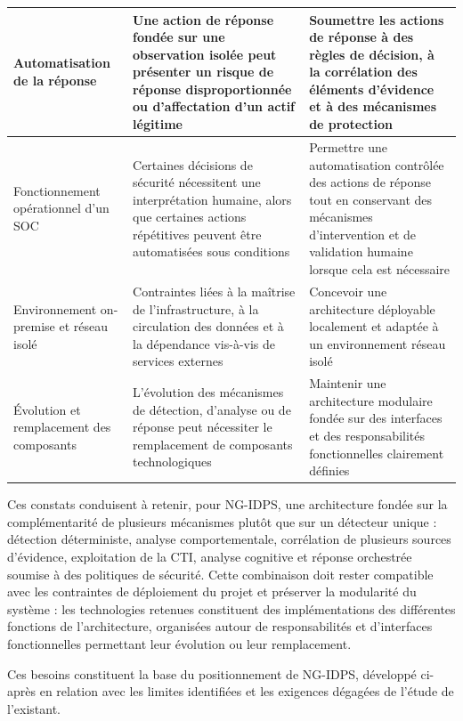 \begin{xltabular}{\textwidth}{|>{\raggedright\arraybackslash}X|>{\raggedright\arraybackslash}X|>{\raggedright\arraybackslash}X|}
Automatisation de la réponse &
Une action de réponse fondée sur une observation isolée peut présenter un risque de réponse disproportionnée ou d'affectation d'un actif légitime &
Soumettre les actions de réponse à des règles de décision, à la corrélation des éléments d'évidence et à des mécanismes de protection \\ \hline

Fonctionnement opérationnel d'un SOC &
Certaines décisions de sécurité nécessitent une interprétation humaine, alors que certaines actions répétitives peuvent être automatisées sous conditions &
Permettre une automatisation contrôlée des actions de réponse tout en conservant des mécanismes d'intervention et de validation humaine lorsque cela est nécessaire \\ \hline

Environnement on-premise et réseau isolé &
Contraintes liées à la maîtrise de l'infrastructure, à la circulation des données et à la dépendance vis-à-vis de services externes &
Concevoir une architecture déployable localement et adaptée à un environnement réseau isolé \\ \hline

Évolution et remplacement des composants &
L'évolution des mécanismes de détection, d'analyse ou de réponse peut nécessiter le remplacement de composants technologiques &
Maintenir une architecture modulaire fondée sur des interfaces et des responsabilités fonctionnelles clairement définies \\ \hline

\end{xltabular}


Ces constats conduisent à retenir, pour NG-IDPS, une architecture fondée sur la complémentarité de plusieurs mécanismes plutôt que sur un détecteur unique : détection déterministe, analyse comportementale, corrélation de plusieurs sources d'évidence, exploitation de la CTI, analyse cognitive et réponse orchestrée soumise à des politiques de sécurité. Cette combinaison doit rester compatible avec les contraintes de déploiement du projet et préserver la modularité du système : les technologies retenues constituent des implémentations des différentes fonctions de l'architecture, organisées autour de responsabilités et d'interfaces fonctionnelles permettant leur évolution ou leur remplacement.

Ces besoins constituent la base du positionnement de NG-IDPS, développé ci-après en relation avec les limites identifiées et les exigences dégagées de l'étude de l'existant.

